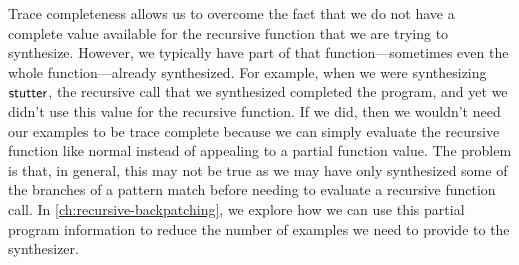 Trace completeness allows us to overcome the fact that we do not have a complete value available for the recursive function that we are trying to synthesize.
However, we typically have part of that function---sometimes even the whole function---already synthesized.
For example, when we were synthesizing $\mathsf{stutter}$, the recursive call that we synthesized completed the program, and yet we didn't use this value for the recursive function.
If we did, then we wouldn't need our examples to be trace complete because we can simply evaluate the recursive function like normal instead of appealing to a partial function value.
The problem is that, in general, this may not be true as we may have only synthesized some of the branches of a pattern match before needing to evaluate a recursive function call.
In \autoref{ch:recursive-backpatching}, we explore how we can use this partial program information to reduce the number of examples we need to provide to the synthesizer.
